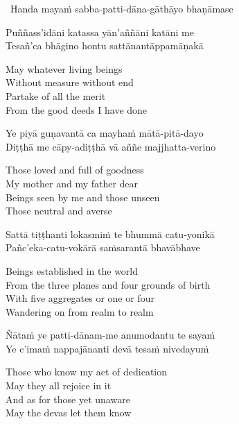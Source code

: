 \begin{leader}
  \anglebracketleft\ \hspace{-0.5mm}Handa mayaṁ sabba-patti-dāna-gāthāyo bhaṇāmase \hspace{-0.5mm}\anglebracketright\
\end{leader}

Puññass'idāni katassa yān'aññāni katāni me\\
Tesañ'ca bhāgino hontu sattānantāppamāṇakā

\begin{english-verses}
  May whatever living beings\\
  Without measure without end\\
  Partake of all the merit\\
  From the good deeds I have done
\end{english-verses}

Ye piyā guṇavantā ca mayhaṁ mātā-pitā-dayo\\
Diṭṭhā me cāpy-adiṭṭhā vā aññe majjhatta-verino

\begin{english-verses}
  Those loved and full of goodness\\
  My mother and my father dear\\
  Beings seen by me and those unseen\\
  Those neutral and averse
\end{english-verses}

Sattā tiṭṭhanti lokasmiṁ te bhummā catu-yonikā\\
Pañc'eka-catu-vokārā saṁsarantā bhavābhave

\begin{english-verses}
  Beings established in the world\\
  From the three planes and four grounds of birth\\
  With five aggregates or one or four\\
  Wandering on from realm to realm
\end{english-verses}

Ñātaṁ ye patti-dānam-me anumodantu te sayaṁ\\
Ye c'imaṁ nappajānanti devā tesaṁ nivedayuṁ

\begin{english-verses}
  Those who know my act of dedication\\
  May they all rejoice in it\\
  And as for those yet unaware\\
  May the devas let them know
\end{english-verses}

